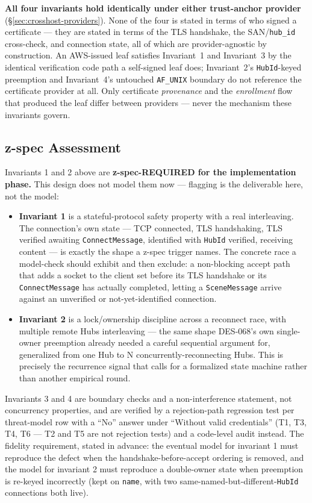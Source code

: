 \documentclass[a4paper,10pt]{article}
\newcommand{\msg}[1]{\texttt{#1}}
\newcommand{\field}[1]{\texttt{#1}}
\begin{document}
\textbf{All four invariants hold identically under either trust-anchor
provider} (\S\ref{sec:crosshost-providers}).  None of the four is stated
in terms of who signed a certificate --- they are stated in terms of the
TLS handshake, the SAN/\field{hub\_id} cross-check, and connection
state, all of which are provider-agnostic by construction.  An
AWS-issued leaf satisfies Invariant~1 and Invariant~3 by the identical
verification code path a self-signed leaf does; Invariant~2's
\texttt{HubId}-keyed preemption and Invariant~4's untouched
\field{AF\_UNIX} boundary do not reference the certificate provider at
all.  Only certificate \emph{provenance} and the \emph{enrollment} flow
that produced the leaf differ between providers --- never the mechanism
these invariants govern.

\subsection{z-spec Assessment}

Invariants 1 and 2 above are \textbf{z-spec-REQUIRED for the
implementation phase.}  This design does not model them now --- flagging
is the deliverable here, not the model:

\begin{itemize}
  \item \textbf{Invariant 1} is a stateful-protocol safety property with a
    real interleaving.  The connection's own state --- TCP connected, TLS
    handshaking, TLS verified awaiting \msg{ConnectMessage}, identified
    with \texttt{HubId} verified, receiving content --- is exactly the
    shape a z-spec trigger names.  The concrete race a model-check should
    exhibit and then exclude: a non-blocking accept path that adds a
    socket to the client set before its TLS handshake or its
    \msg{ConnectMessage} has actually completed, letting a
    \msg{SceneMessage} arrive against an unverified or not-yet-identified
    connection.
  \item \textbf{Invariant 2} is a lock/ownership discipline across a
    reconnect race, with multiple remote Hubs interleaving --- the same
    shape DES-068's own single-owner preemption already needed a careful
    sequential argument for, generalized from one Hub to N
    concurrently-reconnecting Hubs.  This is precisely the recurrence
    signal that calls for a formalized state machine rather than another
    empirical round.
\end{itemize}

Invariants 3 and 4 are boundary checks and a non-interference statement,
not concurrency properties, and are verified by a rejection-path
regression test per threat-model row with a ``No'' answer under ``Without
valid credentials'' (T1, T3, T4, T6 --- T2 and T5 are not rejection tests)
and a code-level audit instead.  The
fidelity requirement, stated in advance: the eventual model for invariant
1 must reproduce the defect when the handshake-before-accept ordering is
removed, and the model for invariant 2 must reproduce a double-owner state
when preemption is re-keyed incorrectly (kept on \field{name}, with two
same-named-but-different-\texttt{HubId} connections both live).
\end{document}
